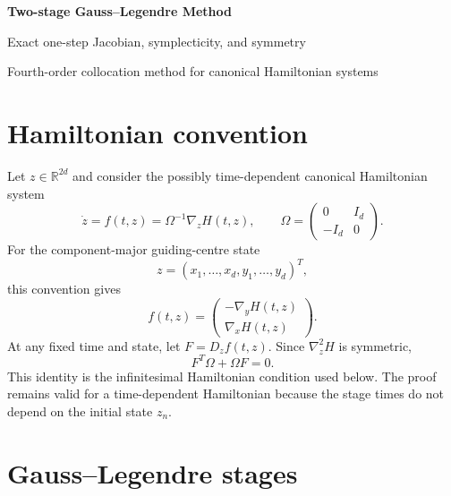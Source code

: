 \documentclass[11pt,a4paper]{article}
\newcommand{\R}{\mathbb{R}}
\newcommand{\Id}{I}
\newcommand{\Om}{\Omega}
\begin{document}
\begin{center}
  {\LARGE\bfseries\color{blue}Two-stage Gauss--Legendre Method}\par
  \vspace{0.35em}
  {\large Exact one-step Jacobian, symplecticity, and symmetry}\par
  \vspace{0.45em}
  {\small Fourth-order collocation method for canonical Hamiltonian systems}
\end{center}

\vspace{0.5em}

\section{Hamiltonian convention}

Let $z\in\R^{2d}$ and consider the possibly time-dependent canonical
Hamiltonian system
\begin{equation}
 \dot z=f(t,z)=\Om^{-1}\nabla_z H(t,z),
 \qquad
 \Om=
 \begin{pmatrix}
  0&\Id_d\\
  -\Id_d&0
 \end{pmatrix}.
 \label{eq:hamiltonian-system}
\end{equation}
For the component-major guiding-centre state
\[
 z=(x_1,\ldots,x_d,y_1,\ldots,y_d)^T,
\]
this convention gives
\[
 f(t,z)=
 \begin{pmatrix}
  -\nabla_y H(t,z)\\
  \nabla_x H(t,z)
 \end{pmatrix}.
\]
At any fixed time and state, let $F=D_zf(t,z)$.  Since
$\nabla_z^2H$ is symmetric,
\begin{equation}
 F^T\Om+\Om F=0.
 \label{eq:hamiltonian-jacobian}
\end{equation}
This identity is the infinitesimal Hamiltonian condition used below.  The
proof remains valid for a time-dependent Hamiltonian because the stage times
do not depend on the initial state $z_n$.

\section{Gauss--Legendre stages}
\end{document}
